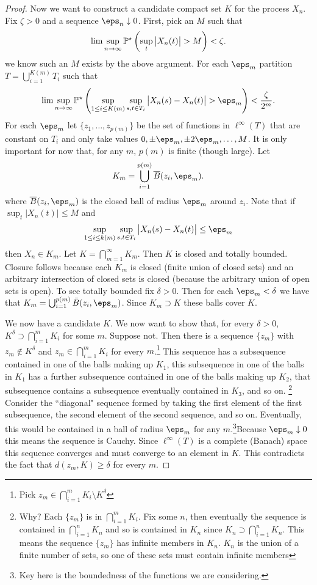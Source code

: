 \begin{proof}
	Now we want to construct a candidate compact set \(K\) for the process  \(X_n\). Fix \(\zeta > 0\) and a sequence  \(\eps_n\downarrow 0\). First, pick an \(M\) such that
	 \[
		 \lim\sup_{n\to\infty}\P^\star\left(\sup_t\left|X_n(t)\right|>M\right)<\zeta
	.\] 
	we know such an \(M\) exists by the above argument. For each \(\eps_m\) partition  \(T = \bigcup_{i=1}^{K(m)}T_i\) such that
	 \[
		 \lim\sup_{n\to\infty}\P^\star\left(\sup_{1\leq i\leq K(m)}\sup_{s,t\in T_i}\left|X_n(s)-X_n(t)\right|>\eps_m\right)<\frac{\zeta}{2^m} 
	.\] 
	For each \(\eps_m\) let  \(\{z_1,\dots,z_{p(m)}\}\) be the set of functions in \(\ell^\infty(T)\) that are constant on  \(T_i\) and only take values  \(0, \pm\eps_m, \pm 2\eps_m,\dots,M\). It is only important for now that, for any \(m\),  \(p(m)\) is finite (though large). Let
	\[
		K_m  = \bigcup_{i=1}^{p(m)} \overline{B}(z_i,\eps_m)
	.\]
	where \(\overline{B}(z_i,\eps_m)\) is the closed ball of radius  \(\eps_m\) around  \(z_i\). Note that if  \(\sup_t \left|X_n(t)\right| \leq M\) and \[\sup_{1\leq i\leq k(m)}\sup_{s,t\in T_i}\left|X_n(s)-X_n(t)\right|\leq \eps_m\] then \(X_n \in K_m\). Let  \(K = \bigcap_{m=1}^\infty K_m\). Then  \(K\) is closed and totally bounded. Closure follows because each  \(K_m\) is closed (finite union of closed sets)  and an arbitrary intersection of closed sets is closed (because the arbitrary union of open sets is open). To see totally bounded fix \(\delta > 0\). Then for each  \(\eps_m <\delta\) we have that  \(K_m = \bigcup_{i=1}^{p(m)}\bar{B}(z_i,\eps_m)\). Since \(K_m \supset K\) these balls cover  \(K\).

	We now have a candidate \(K\). We now want to show that, for every  \(\delta > 0\),  \(K^\delta \supset \bigcap_{i=1}^m K_i\) for some \(m\). Suppose not. Then there is a sequence  \(\{z_{m}\} \) with \(z_{m} \not\in K^\delta\) and \(z_m \in \bigcap_{i=1}^m K_i\) for every \(m\).\footnote{ Pick \(z_m \in \bigcap_{i=1}^m K_i\setminus K^\delta\) } This sequence has a subsequence contained in one of the balls making up \(K_1\), this subsequence in one of the balls in  \(K_1\) has a further subsequence contained in one of the balls making up  \(K_2\), that subsequence contains a subsequence eventually contained in \(K_3\), and so on.
	\footnote{ Why? Each \(\{z_m\}\) is in \(\bigcap_{i=1}^m K_i\). Fix some \(n\), then eventually the sequence is contained in  \(\bigcap_{i=1}^n K_n\) and so is contained in  \(K_n\) since  \(K_n \supset \bigcap_{i=1}^n K_n\). This means the sequence \(\{z_m\} \) has infinite members in \(K_n\).  \(K_n\) is the union of a finite number of sets, so one of these sets must contain infinite members}
	Consider the ``diagonal" sequence formed by taking the first element of the first subsequence, the second element of the second sequence, and so on. Eventually, this would be contained in a ball of radius \(\eps_m\) for any  \(m\).\footnote{Key here is the boundedness of the functions we are considering.}Because \(\eps_m \downarrow 0\) this means the sequence is Cauchy. Since  \(\ell^\infty(T)\) is a complete (Banach) space this sequence converges and must converge to an element in \(K\). This contradicts the fact that  \(d(z_m, K) \geq \delta\) for every \(m\).


\end{proof}
